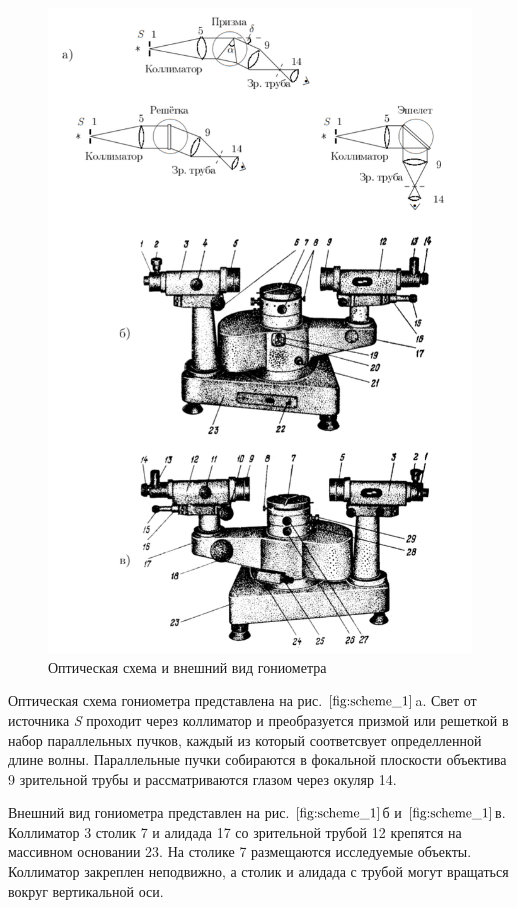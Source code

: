 \documentclass[a4paper, 12pt]{article}%
\begin{document}
\begin{figure}[h!]
\centering
\includegraphics[scale=1]{images/scheme_1.png}
\caption{Оптическая схема и внешний вид гониометра}
\label{fig:scheme_1}
\end{figure}

Оптическая схема гониометра представлена на рис. $\ref{fig:scheme_1}$a. Свет от источника \textit{S} проходит через коллиматор и преобразуется призмой или решеткой в набор параллельных пучков, каждый из который соответсвует определленной длине волны. Параллельные пучки собираются в фокальной плоскости объектива 9 зрительной трубы и рассматриваются глазом через окуляр 14.

Внешний вид гониометра представлен на рис. $\ref{fig:scheme_1}$б и $\ref{fig:scheme_1}$в. Коллиматор 3 столик 7 и алидада 17 со зрительной трубой 12 крепятся на массивном основании 23. На столике 7 размещаются исследуемые объекты. Коллиматор закреплен неподвижно, а столик и алидада с трубой могут вращаться вокруг вертикальной оси.
\end{document}
